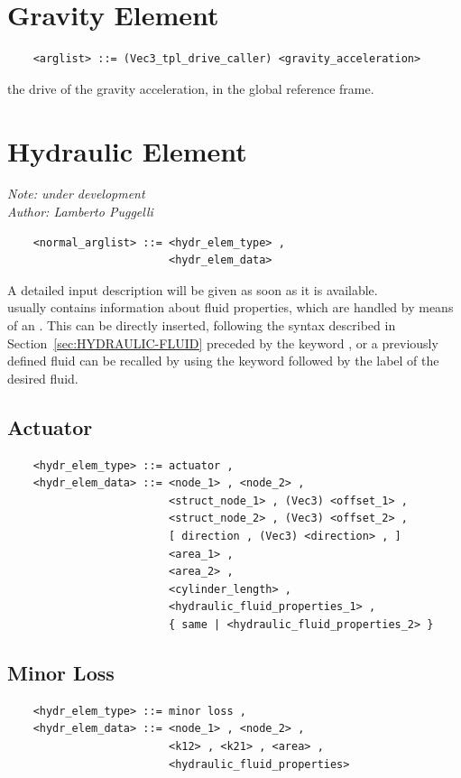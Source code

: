 \section{Gravity Element}
\begin{verbatim}
    <arglist> ::= (Vec3_tpl_drive_caller) <gravity_acceleration>
\end{verbatim}
the drive of the gravity acceleration, in the global reference frame.




\section{Hydraulic Element}\label{sec:EL:HYDR}
{\em 
    Note: under development \\
    Author: Lamberto Puggelli
}
\begin{verbatim}
    <normal_arglist> ::= <hydr_elem_type> , 
                         <hydr_elem_data>
\end{verbatim}
A detailed input description will be given as soon as it is available. \\
 usually contains information about fluid
properties, which are handled by means of an .
This can be directly inserted, following the syntax described in
Section~\ref{sec:HYDRAULIC-FLUID} preceded by the keyword , or a
previously defined fluid can be recalled by using the keyword 
 followed by the label of the desired fluid.

\subsection{Actuator}
\begin{verbatim}
    <hydr_elem_type> ::= actuator ,
    <hydr_elem_data> ::= <node_1> , <node_2> , 
                         <struct_node_1> , (Vec3) <offset_1> ,
                         <struct_node_2> , (Vec3) <offset_2> ,
                         [ direction , (Vec3) <direction> , ]
                         <area_1> ,
                         <area_2> ,
                         <cylinder_length> ,
                         <hydraulic_fluid_properties_1> ,
                         { same | <hydraulic_fluid_properties_2> }
\end{verbatim}

\subsection{Minor Loss}
\begin{verbatim}
    <hydr_elem_type> ::= minor loss ,
    <hydr_elem_data> ::= <node_1> , <node_2> ,
                         <k12> , <k21> , <area> ,
                         <hydraulic_fluid_properties>
\end{verbatim}

